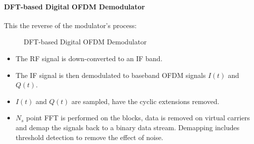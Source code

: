\paragraph{\gls{DFT}-based Digital \gls{OFDM} Demodulator}
This the reverse of the modulator's process:
\begin{figure}[h!]
	\centerline{\resizebox{16cm}{!}{}}
	\caption{\gls{DFT}-based Digital \gls{OFDM} Demodulator}
	\label{fig:dft_demod}
\end{figure}
\begin{itemize}
	\item The \gls{RF} signal is down-converted to an \gls{IF} band.
	\item The \gls{IF} signal is then demodulated to baseband \gls{OFDM} signals $I(t)$ and $Q(t)$.
	\item $I(t)$ and $Q(t)$ are sampled, have the cyclic extensions removed.
	\item $N_s$ point \gls{FFT} is performed on the blocks, data is removed on virtual carriers and demap the signals back to a binary data stream. Demapping includes threshold detection to remove the effect of noise.
\end{itemize}
\pagebreak

